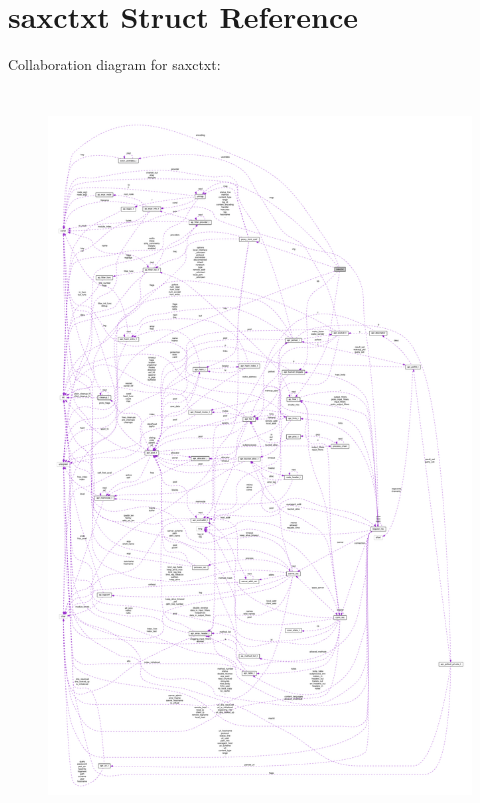 \hypertarget{structsaxctxt}{}\section{saxctxt Struct Reference}
\label{structsaxctxt}


Collaboration diagram for saxctxt\+:
\nopagebreak
\begin{figure}[H]
\begin{center}
\leavevmode
\includegraphics[height=550pt]{structsaxctxt__coll__graph}
\end{center}
\end{figure}
